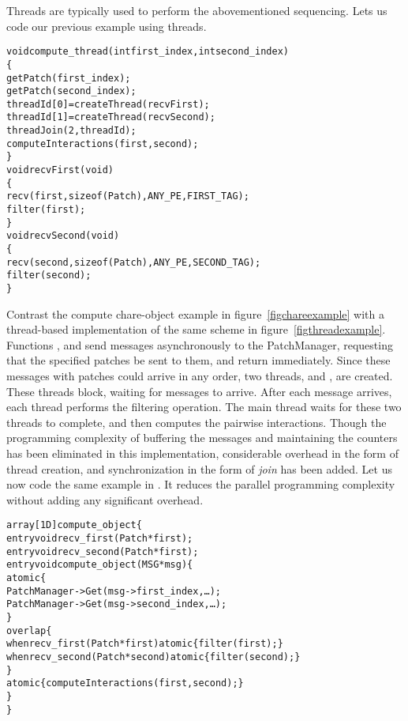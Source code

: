 Threads are typically used to perform the abovementioned sequencing.
Lets us code our previous example using threads.

\begin{center}
\begin{alltt}
void compute_thread(int first_index, int second_index)
\{
    getPatch(first_index);
    getPatch(second_index);
    threadId[0] = createThread(recvFirst);
    threadId[1] = createThread(recvSecond);
    threadJoin(2, threadId);
    computeInteractions(first, second);
  \}
  void recvFirst(void)
  \{
    recv(first, sizeof(Patch), ANY_PE, FIRST_TAG);
    filter(first);
  \}
  void recvSecond(void)
  \{
    recv(second, sizeof(Patch), ANY_PE, SECOND_TAG);
    filter(second);
  \}
\end{alltt}
\end{center}

Contrast the compute chare-object example in figure~\ref{figchareexample} with
a thread-based implementation of the same scheme in
figure~\ref{figthreadexample}. Functions , and  send
messages asynchronously to the PatchManager, requesting that the specified
patches be sent to them, and return immediately. Since these messages with
patches could arrive in any order, two threads,  and
, are created. These threads block, waiting for messages to
arrive. After each message arrives, each thread performs the filtering
operation. The main thread waits for these two threads to complete, and then
computes the pairwise interactions. Though the programming complexity of
buffering the messages and maintaining the counters has been eliminated in this
implementation, considerable overhead in the form of thread creation, and
synchronization in the form of {\em join} has been added. Let us now code the
same example in \sdag. It reduces the parallel programming complexity without
adding any significant overhead.

\begin{center}
\begin{alltt}
  array[1D] compute_object \{
    entry void recv_first(Patch *first);
    entry void recv_second(Patch *first);
    entry void compute_object(MSG *msg)\{
      atomic \{
         PatchManager->Get(msg->first_index,\dots);
         PatchManager->Get(msg->second_index,\dots);
      \}
      overlap \{
        when recv_first(Patch *first) atomic \{ filter(first); \}
        when recv_second(Patch *second) atomic \{ filter(second); \}
      \}
      atomic \{ computeInteractions(first, second); \}
    \}
  \}
\end{alltt}
\end{center}

